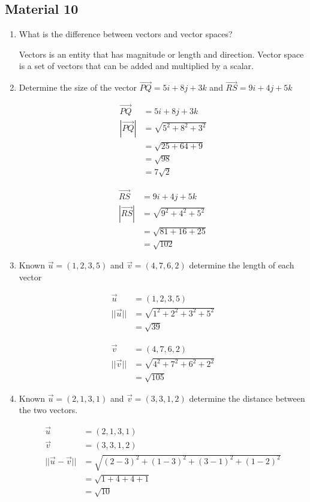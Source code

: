 \documentclass[12pt,titlepage]{article}
\begin{document}
\subsection*{Material 10}
\begin{enumerate}
    \item {
        What is the difference between vectors and vector spaces?

        Vectors is an entity that has magnitude or length and direction.
        Vector space is a set of vectors that can be added and multiplied by a scalar.
    }
    \item {
        Determine the size of the vector $\vec{PQ} = 5i + 8j + 3k$ and $\vec{RS} = 9i + 4j + 5k$

        \begin{align*}
            \vec{PQ} &= 5i + 8j +3k \\
            |\vec{PQ}| &= \sqrt{5^2 + 8^2 + 3^2} \\
            &= \sqrt{25 + 64 + 9} \\
            &= \sqrt{98} \\
            &= 7\sqrt2
        \end{align*}

        \begin{align*}
            \vec{RS} &= 9i + 4j + 5k \\
            |\vec{RS}| &= \sqrt{9^2 + 4^2 + 5^2} \\ 
            &= \sqrt{81 + 16 + 25} \\
            &= \sqrt{102}
        \end{align*}
    }
    \item {
        Known $\vec{u} = (1,2,3,5)$ and $\vec{v} = (4,7,6,2)$ determine the length of each vector

        \begin{align*}
            \vec{u} &= (1, 2, 3, 5) \\
            ||\vec{u}|| &= \sqrt{1^2 + 2^2 + 3^2 + 5^2} \\ 
            &= \sqrt{39}
        \end{align*}

        \begin{align*}
            \vec{v} &= (4,7,6,2) \\ 
            ||\vec{v}|| &= \sqrt{4^2 + 7^2 + 6^2 + 2^2} \\
            &= \sqrt{105}
        \end{align*}
    }
    \item {
        Known $\vec{u} = (2,1,3,1)$ and $\vec{v} = (3,3,1,2)$ determine the distance between the two vectors.

        \begin{align*}
            \vec{u} &= (2,1,3,1) \\
            \vec{v} &= (3,3,1,2) \\
            ||\vec{u} - \vec{v}|| &= \sqrt{(2-3)^2 + (1-3)^2 + (3-1)^2 + (1-2)^2} \\
            &= \sqrt{1 + 4 + 4 + 1} \\
            &= \sqrt{10}
        \end{align*}
    }
\end{enumerate}
\end{document}
